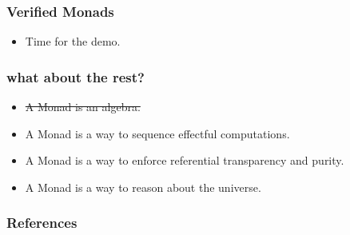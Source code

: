 \documentclass[hyperref={colorlinks = true,linkcolor = blue, citecolor = blue, urlcolor = blue}]{beamer}
\begin{document}
\begin{frame}[fragile]
  \frametitle{Verified Monads}
  \begin{itemize}
    \item Time for the demo.
  \end{itemize}
\end{frame}

\begin{frame}[fragile]
  \frametitle{what about the rest?}
    \begin{itemize}
      \item \sout{A Monad is an algebra.}
      \item A Monad is a way to sequence effectful computations.
      \item A Monad is a way to enforce referential transparency and purity.
      \item A Monad is a way to reason about the universe.
    \end{itemize}
\end{frame}

\begin{frame}[fragile]
\frametitle{References}
{}
\end{frame}
\end{document}
